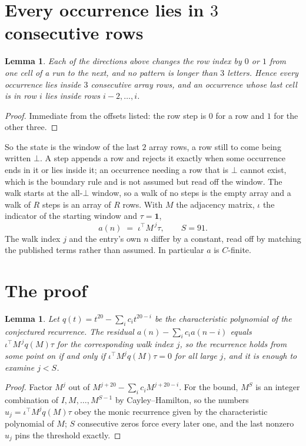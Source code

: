 \documentclass[11pt,a4paper]{article}
\theoremstyle{plain}
\newtheorem{lemma}[theorem]{Lemma}
\theoremstyle{definition}
\begin{document}
\section{Every occurrence lies in $3$ consecutive rows}

\begin{lemma}\label{lem:win}
Each of the directions above changes the row index by $0$ or $1$ from one cell of a run to the
next, and no pattern is longer than $3$ letters. Hence every occurrence lies inside $3$
consecutive array rows, and an occurrence whose last cell is in row $i$ lies inside rows
$i-2,\dots,i$.
\end{lemma}

\begin{proof}
Immediate from the offsets listed: the row step is $0$ for a row and $1$ for the other three.
\end{proof}

So the state is the window of the last $2$ array rows, a row still to come being written
$\bot$. A step appends a row and rejects it exactly when some occurrence ends in it or lies
inside it; an occurrence needing a row that is $\bot$ cannot exist, which is the boundary rule
and is not assumed but read off the window. The walk starts at the all-$\bot$ window, so a walk
of no steps is the empty array and a walk of $R$ steps is an array of $R$ rows. With $M$ the
adjacency matrix, $\iota$ the indicator of the starting window and $\tau=\mathbf{1}$,
\[
a(n)\;=\;\iota^{\!\top}M^{\,j}\tau ,\qquad S=91.
\]
The walk index $j$ and the entry's own $n$ differ by a constant, read off by matching the
published terms rather than assumed. In particular $a$ is $C$-finite.

\section{The proof}

\begin{lemma}\label{lem:crit}
Let $q(t)=t^{20}-\sum_i c_it^{20-i}$ be the characteristic polynomial of the
conjectured recurrence. The residual $a(n)-\sum_ic_ia(n-i)$ equals
$\iota^{\!\top}M^{\,j}q(M)\tau$ for the corresponding walk index $j$, so the recurrence
holds from some point on if and only if $\iota^{\!\top}M^{j}q(M)\tau=0$ for all large $j$,
and it is enough to examine $j<S$.
\end{lemma}

\begin{proof}
Factor $M^{j}$ out of $M^{j+20}-\sum_ic_iM^{j+20-i}$. For the bound, $M^{S}$
is an integer combination of $I,M,\dots,M^{S-1}$ by Cayley--Hamilton, so the numbers
$u_j=\iota^{\!\top}M^{j}q(M)\tau$ obey the monic recurrence given by the characteristic
polynomial of $M$; $S$ consecutive zeros force every later one, and the last nonzero $u_j$
pins the threshold exactly.
\end{proof}
\end{document}
